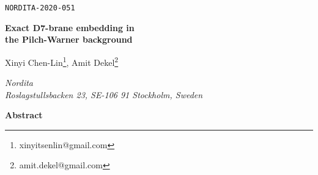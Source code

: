 \documentclass[12pt]{article}
\begin{document}
\begin{flushright}\footnotesize
\texttt{NORDITA-2020-051} \\
\vspace{0.6cm}
\end{flushright}


\begin{center}
{\Large\textbf{ Exact D7-brane embedding in\\ the Pilch-Warner background}
\par}

\vspace{0.8cm}

\textrm{Xinyi Chen-Lin\footnote{xinyitsenlin@gmail.com}, Amit Dekel\footnote{amit.dekel@gmail.com}}
\vspace{4mm}

\textit{Nordita\\
Roslagstullsbacken 23, SE-106 91 Stockholm, Sweden}


\vspace{5mm}

\textbf{Abstract} 
\vspace{5mm}

\begin{minipage}{13cm}

\end{minipage}

\end{center}

\newpage

\tableofcontents

















\end{document}
